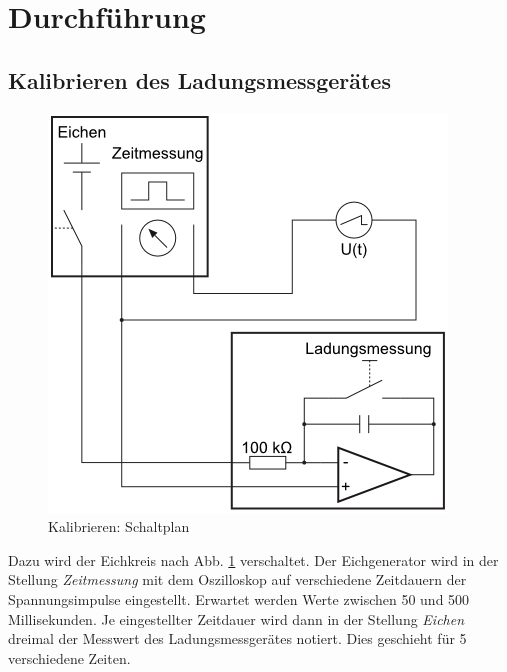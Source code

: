 \documentclass[12pt,a4paper,titlepage,headinclude,bibtotoc]{scrartcl}
\begin{document}
\section{Durchführung}
\label{sec:durchfuehrung}
\subsection{Kalibrieren des Ladungsmessgerätes}
\begin{figure}[!htb]
	\centering
	\includegraphics[scale=0.7]{Eichen.png}
	\caption{Kalibrieren: Schaltplan \cite[Datum: 25.09.2014]{LP11}}
	\label{fig:Eichkreis}
\end{figure}

Dazu wird der Eichkreis nach Abb. \ref{fig:Eichkreis} verschaltet.
Der Eichgenerator wird in der Stellung \emph{Zeitmessung} mit dem Oszilloskop auf verschiedene Zeitdauern der Spannungsimpulse eingestellt.
Erwartet werden Werte zwischen 50 und 500 Millisekunden.
Je eingestellter Zeitdauer wird dann in der Stellung \emph{Eichen} dreimal der Messwert des Ladungsmessgerätes notiert.
Dies geschieht für 5 verschiedene Zeiten.

\newpage
\end{document}

